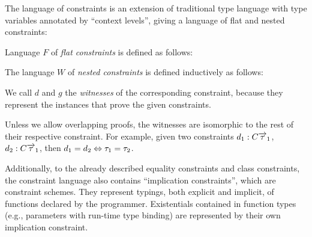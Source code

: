 The language of constraints is an extension of traditional type language with type variables annotated by ``context levels'', giving a language of flat and nested constraints:
\begin{defn}
    \label{def:defer_constr}

    Language $F$ of \emph{flat constraints} is defined as follows:

    \begin{center}\begin{grammar}
    \end{grammar}\end{center}

    The language $W$ of \emph{nested constraints} is defined inductively as follows:

    \begin{center}\begin{grammar}
    \end{grammar}\end{center}

    \label{constraint_language}
\end{defn}

We call $d$ and $g$ the \emph{witnesses} of the corresponding constraint, because they represent the instances that prove the given constraints.

\begin{remark}
    Unless we allow overlapping proofs, the witnesses are isomorphic to the rest of their respective constraint. For example, given two constraints $d_1: C \overrightarrow{\tau}_1$, $d_2: C \overrightarrow{\tau}_1$, then $d_1 = d_2 \Leftrightarrow \tau_1 = \tau_2$.
\end{remark}

Additionally, to the already described equality constraints and class constraints, the constraint language also contains ``implication constraints'', which are constraint schemes. They represent typings, both explicit and implicit, of functions declared by the programmer. Existentials contained in function types (e.g., parameters with run-time type binding) are represented by their own implication constraint.

